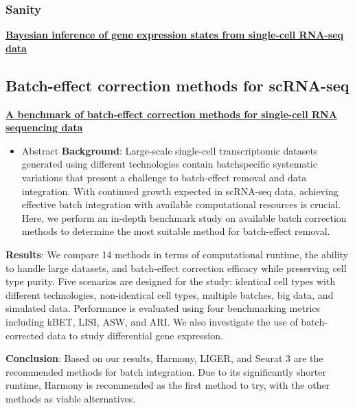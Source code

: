 \documentclass[
]{book}
\providecommand{\tightlist}{%
  \setlength{\itemsep}{0pt}\setlength{\parskip}{0pt}}
\begin{document}
\hypertarget{sanity}{%
\subsubsection{Sanity}\label{sanity}}

\textbf{\href{https://www.nature.com/articles/s41587-021-00875-x}{Bayesian inference of gene expression states from single-cell RNA-seq data}\citep{breda2021bayesian}}

\hypertarget{batch-effect-correction-methods-for-scrna-seq}{%
\subsection{Batch-effect correction methods for scRNA-seq}\label{batch-effect-correction-methods-for-scrna-seq}}

\textbf{\href{https://link.springer.com/article/10.1186/s13059-019-1850-9}{A benchmark of batch-effect correction methods for single-cell RNA sequencing data}\citep{tran2020benchmark}}

\begin{itemize}
\tightlist
\item
  Abstract
  \textbf{Background}: Large-scale single-cell transcriptomic datasets generated using different technologies contain batchspecific
  systematic variations that present a challenge to batch-effect removal and data integration. With continued
  growth expected in scRNA-seq data, achieving effective batch integration with available computational resources is
  crucial. Here, we perform an in-depth benchmark study on available batch correction methods to determine the
  most suitable method for batch-effect removal.
\end{itemize}

\textbf{Results}: We compare 14 methods in terms of computational runtime, the ability to handle large datasets, and
batch-effect correction efficacy while preserving cell type purity. Five scenarios are designed for the study: identical
cell types with different technologies, non-identical cell types, multiple batches, big data, and simulated data.
Performance is evaluated using four benchmarking metrics including kBET, LISI, ASW, and ARI. We also investigate
the use of batch-corrected data to study differential gene expression.

\textbf{Conclusion}: Based on our results, Harmony, LIGER, and Seurat 3 are the recommended methods for batch
integration. Due to its significantly shorter runtime, Harmony is recommended as the first method to try, with the
other methods as viable alternatives.
\end{document}
